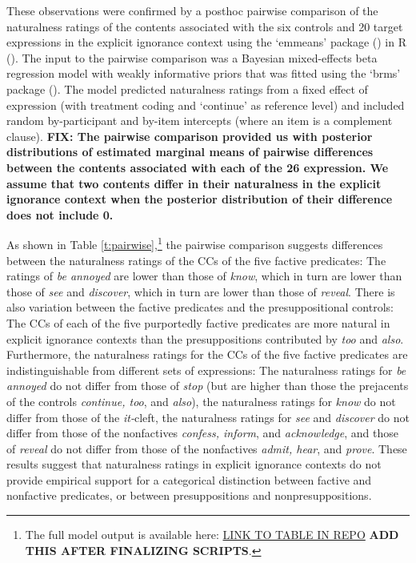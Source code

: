 \documentclass[11pt,fleqn]{article}
\newcommand{\6}{\mbox{$[\hspace*{-.6mm}[$}}
\newcommand{\9}{\mbox{$]\hspace*{-.6mm}]$}}
\begin{document}
These observations were confirmed by a posthoc pairwise comparison of the naturalness ratings of the contents associated with the six controls and 20 target expressions in the explicit ignorance context using the `emmeans' package (\citealt{emmeans}) in R (\citealt{r}). The input to the pairwise comparison was a Bayesian mixed-effects beta regression model with weakly informative priors that was fitted using the `brms' package (\citealt{buerkner2017}). The model predicted naturalness ratings from a fixed effect of expression (with treatment coding and `continue' as reference level) and included random by-participant and by-item intercepts (where an item is a complement clause). {\bf FIX: The pairwise comparison provided us with posterior distributions of estimated marginal means of pairwise differences between the contents associated with each of the 26 expression. We assume that two contents differ in their naturalness in the explicit ignorance context when the posterior distribution of their difference does not include 0. }

As shown in Table \ref{t:pairwise},\footnote{The full model output is available here: \url{LINK TO TABLE IN REPO} {\bf ADD THIS AFTER FINALIZING SCRIPTS}.} the pairwise comparison suggests differences between the naturalness ratings of the CCs of the five factive predicates: The ratings of {\em be annoyed} are lower than those of {\em know}, which in turn are lower than those of {\em see} and {\em discover}, which in turn are lower than those of {\em reveal}. There is also variation between the factive predicates and the presuppositional controls: The CCs of each of the five purportedly factive predicates are more natural in explicit ignorance contexts than the presuppositions contributed by {\em too} and {\em also}. Furthermore, the naturalness ratings for the CCs of the five factive predicates are indistinguishable from different sets of expressions: The naturalness ratings for {\em be annoyed} do not differ from those of {\em stop} (but are higher than those the prejacents of the controls {\em continue, too}, and {\em also}), the naturalness ratings for {\em know} do not differ from those of the {\em it-}cleft, the naturalness ratings for {\em see} and {\em discover} do not differ from those of the nonfactives {\em confess, inform}, and {\em acknowledge}, and those of {\em reveal} do not differ from those of the nonfactives {\em admit, hear}, and {\em prove}. These results suggest that naturalness ratings in explicit ignorance contexts do not provide empirical support for a categorical distinction between factive and nonfactive predicates, or between presuppositions and nonpresuppositions.
\end{document}
